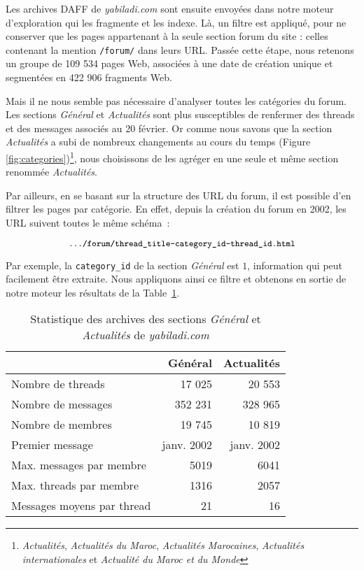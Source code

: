 \documentclass[symmetric,justified,marginals=raggedouter]{tufte-book}
\begin{document}
Les archives DAFF de \textit{yabiladi.com} sont ensuite envoyées dans notre moteur d'exploration qui les fragmente et les indexe. Là, un filtre est appliqué, pour ne conserver que les pages appartenant à la seule section forum du site : celles contenant la mention \texttt{/forum/} dans leurs URL. Passée cette étape, nous retenons un groupe de 109 534 pages Web, associées à une date de création unique et segmentées en 422 906 fragments Web.

Mais il ne nous semble pas nécessaire d'analyser toutes les catégories du forum. Les sections \textit{Général} et \textit{Actualités} sont plus susceptibles de renfermer des threads et des messages associés au 20 février. Or comme nous savons que la section \textit{Actualités} a subi de nombreux changements au cours du temps (Figure \ref{fig:categories})\footnote{\RaggedOuter\textit{Actualités}, \textit{Actualités du Maroc}, \textit{Actualités Marocaines},  \textit{Actualités internationales} et \textit{Actualité du Maroc et du Monde}}, nous choisissons de les agréger en une seule et même section renommée \textit{Actualités}. 

Par ailleurs, en se basant sur la structure des URL du forum, il est possible d'en filtrer les pages par catégorie. En effet, depuis la création du forum en 2002, les URL suivent toutes le même schéma~:

\[
\small
\texttt{.../forum/thread\_title-category\_id-thread\_id.html}
\] 

\noindent Par exemple, la \texttt{category\_id} de la section \textit{Général} est $1$, information qui peut facilement être extraite. Nous appliquons ainsi ce filtre et obtenons en sortie de notre moteur les résultats de la Table~\ref{tab:forum}.

\begin{table}
  \centering
  \label{tab:forum}
  \begin{tabular}{lrr}
    \toprule
    & Général & Actualités\\
    \midrule    
    Nombre de threads&17 025&20 553\\
    Nombre de messages&352 231&328 965\\
    Nombre de membres&19 745&10 819\\
	Premier message&janv. 2002&janv. 2002\\    	
	Max. messages par membre&5019&6041\\	
	Max. threads par membre&1316&2057\\
	Messages moyens par thread&21&16\\    
  \bottomrule
  \end{tabular}
  \bigskip
  \caption{Statistique des archives des sections \textit{Général} et \textit{Actualités} de \textit{yabiladi.com}}
\end{table} 
\end{document}
